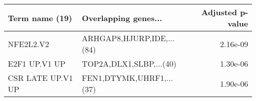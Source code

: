\begin{tabular}{llr}
\toprule
   Term name (19) &      Overlapping genes... &  Adjusted p-value \\
\midrule
        NFE2L2.V2 & ARHGAP8,HJURP,IDE,...(84) &          2.16e-09 \\
    E2F1 UP.V1 UP &   TOP2A,DLX1,SLBP,...(40) &          1.30e-06 \\
CSR LATE UP.V1 UP &  FEN1,DTYMK,UHRF1,...(37) &          1.90e-06 \\
\bottomrule
\end{tabular}

